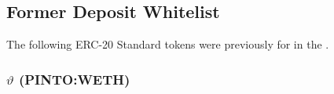 \documentclass[class=article, crop=false]{standalone}
\begin{document}

\subsection{Former Deposit Whitelist}\label{sec:former-deposit-whitelist}

The following ERC-20 Standard tokens were previously  for  in the .


\vspace{0.2cm}
\subsubsection{$\vartheta$ (PINTO:WETH)}
\vspace{0.2cm}
\end{document}
